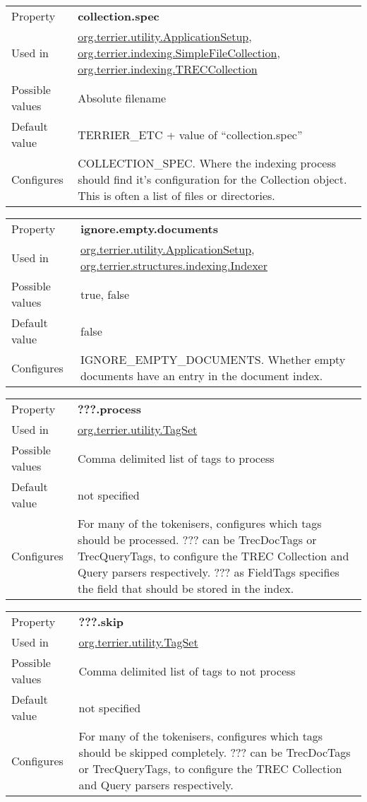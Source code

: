 \begin{longtable}[]{@{}ll@{}}
\toprule
Property & \textbf{collection.spec}\tabularnewline
Used in &
\href{javadoc/org/terrier/utility/ApplicationSetup.html}{org.terrier.utility.ApplicationSetup},
\href{javadoc/org/terrier/indexing/SimpleFileCollection.html}{org.terrier.indexing.SimpleFileCollection},
\href{javadoc/org/terrier/indexing/TRECCollection.html}{org.terrier.indexing.TRECCollection}\tabularnewline
Possible values & Absolute filename\tabularnewline
Default value & TERRIER\_ETC + value of
``collection.spec''\tabularnewline
Configures & COLLECTION\_SPEC. Where the indexing process should find
it's configuration for the Collection object. This is often a list of
files or directories.\tabularnewline
\bottomrule
\end{longtable}

\begin{longtable}[]{@{}ll@{}}
\toprule
Property & \textbf{ignore.empty.documents}\tabularnewline
Used in &
\href{javadoc/org/terrier/utility/ApplicationSetup.html}{org.terrier.utility.ApplicationSetup},
\href{javadoc/org/terrier/structures/indexing/Indexer.html}{org.terrier.structures.indexing.Indexer}\tabularnewline
Possible values & true, false\tabularnewline
Default value & false\tabularnewline
Configures & IGNORE\_EMPTY\_DOCUMENTS. Whether empty documents have an
entry in the document index.\tabularnewline
\bottomrule
\end{longtable}

\begin{longtable}[]{@{}ll@{}}
\toprule
Property & \textbf{???.process}\tabularnewline
Used in &
\href{javadoc/org/terrier/utility/TagSet.html}{org.terrier.utility.TagSet}\tabularnewline
Possible values & Comma delimited list of tags to process\tabularnewline
Default value & not specified\tabularnewline
Configures & For many of the tokenisers, configures which tags should be
processed. ??? can be TrecDocTags or TrecQueryTags, to configure the
TREC Collection and Query parsers respectively. ??? as FieldTags
specifies the field that should be stored in the index.\tabularnewline
\bottomrule
\end{longtable}

\begin{longtable}[]{@{}ll@{}}
\toprule
Property & \textbf{???.skip}\tabularnewline
Used in &
\href{javadoc/org/terrier/utility/TagSet.html}{org.terrier.utility.TagSet}\tabularnewline
Possible values & Comma delimited list of tags to not
process\tabularnewline
Default value & not specified\tabularnewline
Configures & For many of the tokenisers, configures which tags should be
skipped completely. ??? can be TrecDocTags or TrecQueryTags, to
configure the TREC Collection and Query parsers
respectively.\tabularnewline
\bottomrule
\end{longtable}

